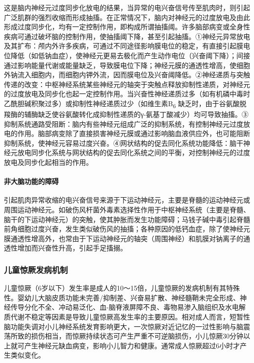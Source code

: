 这是脑内神经元过度同步化放电的结果，当异常的电兴奋信号传至肌肉时，则引起广泛肌群的强烈收缩而形成抽搐。在正常情况下，脑内对神经元的过度放电及由此形成过度同步化，均有一定控制作用，即构成所谓抽搐阈。许多脑部病变或全身性疾病可通过破坏脑的控制作用，使抽搐阈下降，甚至引起抽搐。①神经元异常放电及其扩布：颅内外许多疾病，可通过不同途径影响膜电位的稳定，有直接引起膜电位降低（如低钠血症），使神经元更易去极化而产生动作电位（兴奋阈下降）；间接通过影响能量代谢或能量缺乏，导致膜电位下降；神经元膜的通透性增高，使细胞外钠流入细胞内，而细胞内钾外流，因而膜电位及兴奋阈降低。②神经递质与突触传递的改变：中枢神经系统某些神经元的轴突于突触点释放抑制性递质，对神经元的过度放电及同步化也起一定控制作用。当兴奋性神经递质过多（如有机磷中毒时乙酰胆碱积聚过多）或抑制性神经递质过少（如维生素B\textsubscript{6}
缺乏时，由于谷氨酸脱羧酶的辅酶缺乏使谷氨酸转化成抑制性递质的γ-氨基丁酸减少）均可导致抽搐。③抑制系统通路受阻断：脑内有些神经元组成广泛的抑制系统，有控制神经元过度放电的作用。脑部病变除了直接损害神经元膜或通过影响脑血液供应外，也可能阻断抑制系统，使神经元容易过度兴奋。④网状结构的促去同化系统功能降低：脑干神经元放电同步化系统与网状结构的促去同化系统之间的平衡，对控制神经元的过度放电及同步化起相当的作用。

\paragraph{非大脑功能的障碍}

引起肌肉异常收缩的电兴奋信号来源于下运动神经元，主要是脊髓的运动神经元或周围运动神经元。如破伤风杆菌外毒素选择性作用于中枢神经系统（主要是脊髓、脑干的下运动神经元）的突触，使其肿胀而发生功能障碍；马钱子碱中毒引起脊髓前角细胞过度兴奋，发生类似破伤风的抽搐；各种原因的低钙血症，除了使神经元膜通透性增高外，也常由于下运动神经元的轴突（周围神经）和肌膜对钠离子的通透性增加而兴奋性升高，引起手足搐搦。

\subsubsection{儿童惊厥发病机制}

儿童惊厥（6岁以下）发生率是成人的10～15倍，儿童惊厥的发病机制有其特殊性。婴幼儿大脑皮质功能未完善/抑制差、兴奋易扩散、神经髓鞘未完全形成、神经传导分化不全、冲动易泛化、血-脑脊液屏障不良、毒物易渗入脑组织及水电解质代谢不稳定等因素是导致儿童惊厥高发生率的主要原因。相对成人而言，短暂性脑功能失调对小儿神经系统发育影响更大，一次惊厥对近记忆的一过性影响与脑震荡所致的损伤相当，而惊厥持续状态可产生严重不可逆脑损伤，小儿惊厥30分钟以上就可产生神经元缺血病变，影响小儿智力和健康。通常成人惊厥超过6小时才产生类似变化。

